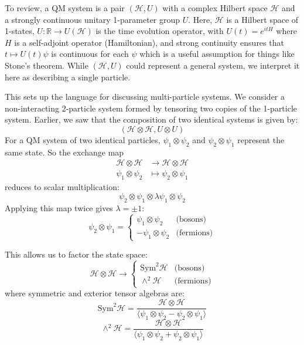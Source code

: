 To review, a QM system is a pair $(\mathcal{H}, U)$ with a complex Hilbert space $\mathcal{H}$ and a strongly continuous unitary 1-parameter group $U$. Here, $\mathcal{H}$ is a Hilbert space of 1-states, $U:\mathbb{R}\to U(\mathcal{H})$ is the time evolution operator, with $U(t)=e^{itH}$ where $H$ is a self-adjoint operator (Hamiltonian), and strong continuity ensures that $t\mapsto U(t)\psi$ is continuous for each $\psi$ which is a useful assumption for things like Stone's theorem.  While $(\mathcal{H}, U)$ could represent a general system, we interpret it here as describing a single particle. 

This sets up the language for discussing multi-particle systems. We consider a non-interacting 2-particle system formed by tensoring two copies of the 1-particle system. Earlier, we saw that the composition of two identical systems is given by:
    \[
        (\mathcal{H} \otimes \mathcal{H}, U \otimes U)
    \]
For a QM system of two identical particles, $\psi_1 \otimes \psi_2$ and $\psi_2 \otimes \psi_1$ represent the same state. So the exchange map
    \begin{align*}
        \mathcal{H}\otimes \mathcal{H} &\to \mathcal{H}\otimes \mathcal{H} \\ 
        \psi_1 \otimes \psi_2 &\mapsto \psi_2\otimes \psi_1
    \end{align*}
    reduces to scalar multiplication:
    \[\psi_2 \otimes \psi_1 \otimes \lambda \psi_1 \otimes \psi_2 \]
Applying this map twice gives $\lambda = \pm 1$:
    \[
        \psi_2 \otimes \psi_1 = 
        \begin{cases}
            \psi_1 \otimes \psi_2 & \text{(bosons)} \\
            -\psi_1 \otimes \psi_2 & \text{(fermions)}
        \end{cases}
    \]

This allows us to factor the state space:
    \[
        \mathcal{H} \otimes \mathcal{H} \to 
        \begin{cases}
            \mathrm{Sym}^2 \mathcal{H} & \text{(bosons)} \\
            \wedge^2 \mathcal{H} & \text{(fermions)}
        \end{cases}
    \]
    where symmetric and exterior tensor algebras are:
    \[\mathrm{Sym}^2 \mathcal{H} =\frac{\mathcal{H}\otimes \mathcal{H}}{\langle \psi_1 \otimes \psi_2 - \psi_2 \otimes \psi_1 \rangle}\]
    \[\wedge^2 \mathcal{H} =\frac{\mathcal{H}\otimes \mathcal{H}}{\langle \psi_1 \otimes \psi_2 + \psi_2 \otimes \psi_1 \rangle} \]


